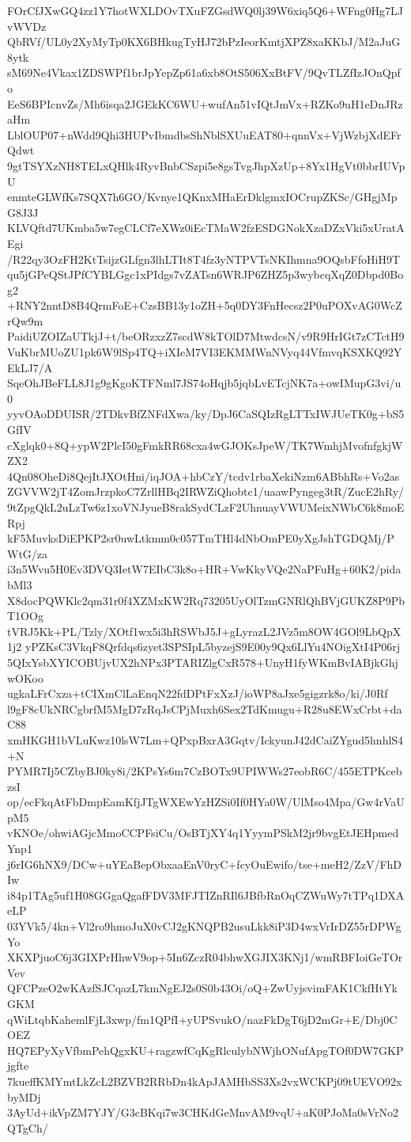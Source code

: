 FOrCfJXwGQ4zz1Y7hotWXLDOvTXuFZGsdWQ0lj39W6xiq5Q6+WFng0Hg7LJvWVDz
QbRVf/UL0y2XyMyTp0KX6BHkugTyHJ72bPzIeorKmtjXPZ8xaKKbJ/M2aJuG8ytk
sM69Ne4Vkax1ZDSWPf1brJpYepZp61a6xb8OtS506XxBtFV/9QvTLZfIzJOnQpfo
EeS6BPIcnvZs/Mh6isqa2JGEkKC6WU+wufAn51vIQtJmVx+RZKo9uH1eDnJRzaHm
LblOUP07+nWdd9Qhi3HUPvIbmdbsShNblSXUuEAT80+qnnVx+VjWzbjXdEFrQdwt
9gtTSYXzNH8TELxQHlk4RyvBnbCSzpi5e8gsTvgJhpXzUp+8Yx1HgVt0bbrIUVpU
enmteGLWfKs7SQX7h6GO/Kvnye1QKnxMHaErDklgmxIOCrupZKSc/GHgjMpG8J3J
KLVQftd7UKmba5w7egCLCf7eXWz0iEcTMaW2fzESDGNokXzaDZxVki5xUratAEgi
/R22qy3OzFH2KtTsijzGLfgn3lhLTIt8T4fz3yNTPVTsNKIhmna9OQsbFfoHiH9T
qu5jGPeQStJPfCYBLGgc1xPIdgs7vZATsn6WRJP6ZHZ5p3wybcqXqZ0Dbpd0Bog2
+RNY2nntD8B4QrmFoE+CzsBB13y1oZH+5q0DY3FnHecsz2P0uPOXvAG0WcZrQw9m
PaidiUZOIZaUTkjJ+t/beORzxzZ7scdW8kTOlD7MtwdcsN/v9R9HrIGt7zCTctH9
VuKbrMUoZU1pk6W9lSp4TQ+iXIeM7VI3EKMMWnNVyq44VfmvqKSXKQ92YEkLJ7/A
SqeOhJBeFLL8J1g9gKgoKTFNml7JS74oHqjb5jqbLvETcjNK7a+owIMupG3vi/u0
yyvOAoDDUISR/2TDkvBfZNFdXwa/ky/DpJ6CaSQIzRgLTTxIWJUeTK0g+bS5GfIV
cXglqk0+8Q+ypW2PlcI50gFmkRR68cxa4wGJOKsJpeW/TK7WmhjMvofnfgkjWZX2
4Qn08OheDi8QejItJXOtHni/iqJOA+hbCzY/tcdv1rbaXekiNzm6ABbhRs+Vo2as
ZGVVW2jT4ZomJrzpkoC7ZrllHBq2IRWZiQhobtc1/uaawPyngeg3tR/ZucE2hRy/
9tZpgQkL2uLzTw6z1xoVNJyueB8rakSydCLzF2UhnuayVWUMeixNWbC6k8moERpj
kF5MuvksDiEPKP2sr0uwLtkmm0c057TmTHl4dNbOmPE0yXgJshTGDQMj/PWtG/za
i3n5Wvu5H0Ev3DVQ3IetW7EIbC3k8o+HR+VwKkyVQe2NaPFuHg+60K2/pidabMl3
X8docPQWKlc2qm31r0f4XZMxKW2Rq73205UyOlTzmGNRlQhBVjGUKZ8P9PbT1OOg
tVRJ5Kk+PL/Tzly/XOtf1wx5i3hRSWbJ5J+gLyrazL2JVz5m8OW4GOl9LbQpX1j2
yPZKsC3VkqF8Qrfdqs6zyet3SPSIpL5byzejS9E00y9Qx6LlYu4NOigXtI4P06rj
5QIxYsbXYICOBUjvUX2hNPx3PTARIZlgCxR578+UnyH1fyWKmBvIABjkGhjwOKoo
ugkaLFrCxza+tCIXmClLaEnqN22fdDPtFxXzJ/ioWP8aJxe5gigzrk8o/ki/J0Rf
l9gF8cUkNRCgbrfM5MgD7zRqJsCPjMuxh6Sex2TdKmugu+R28u8EWxCrbt+daC88
xmHKGH1bVLuKwz10lsW7Lm+QPxpBxrA3Gqtv/IckyunJ42dCaiZYgud5hnhlS4+N
PYMR7Ij5CZbyBJ0ky8i/2KPsYs6m7CzBOTx9UPIWWs27eobR6C/455ETPKcebzsI
op/ecFkqAtFbDmpEamKfjJTgWXEwYzHZSi0If0HYa0W/UlMso4Mpa/Gw4rVaUpM5
vKNOe/ohwiAGjcMmoCCPFsiCu/OsBTjXY4q1YyymPSkM2jr9bvgEtJEHpmedYnp1
j6rIG6hNX9/DCw+uYEaBepObxaaEnV0ryC+fcyOuEwifo/tse+meH2/ZzV/FhDIw
i84p1TAg5uf1H08GGgaQgafFDV3MFJTIZnRIl6JBfbRnOqCZWuWy7tTPq1DXAeLP
03YVk5/4kn+Vl2ro9hmoJuX0vCJ2gKNQPB2usuLkk8iP3D4wxVrIrDZ55rDPWgYo
XKXPjuoC6j3GIXPrHhwV9op+5In6ZczR04bhwXGJIX3KNj1/wmRBFIoiGeTOrVev
QFCPzeO2wKAzfSJCqazL7kmNgEJ2s0S0b43Oi/oQ+ZwUyjsvimFAK1CkfHtYkGKM
qWiLtqbKahemlFjL3xwp/fm1QPfI+yUPSvukO/nazFkDgT6jD2mGr+E/Dbj0COEZ
HQ7EPyXyVfbmPehQgxKU+ragzwfCqKgRlculybNWjhONufApgTOf0DW7GKPjgfte
7kueffKMYmtLkZcL2BZVB2RRbDn4kApJAMHbSS3Xs2vxWCKPj09tUEVO92xbyMDj
3AyUd+ikVpZM7YJY/G3cBKqi7w3CHKdGeMnvAM9vqU+aK0PJoMa0sVrNo2QTgCh/

